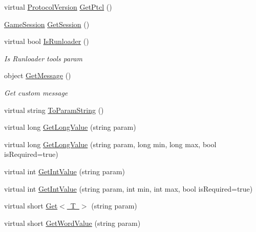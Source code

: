 \begin{DoxyCompactItemize}
virtual \mbox{\hyperlink{namespace_t_net_1_1_service_a6651119df6dac62b849ed58cf7ece2bd}{Protocol\+Version}} \mbox{\hyperlink{class_t_net_1_1_service_1_1_action_getter_aea751fe82e12246f5be7105d8c8c068c}{Get\+Ptcl}} ()
\item 
\mbox{\hyperlink{class_t_net_1_1_contract_1_1_game_session}{Game\+Session}} \mbox{\hyperlink{class_t_net_1_1_service_1_1_action_getter_aca0c42abc01b4f8b2e4e302dbb31098a}{Get\+Session}} ()
\item 
virtual bool \mbox{\hyperlink{class_t_net_1_1_service_1_1_action_getter_af318ee8a4671b6000b036c4c57221458}{Is\+Runloader}} ()
\begin{DoxyCompactList}\small\item\em Is Runloader tool\textquotesingle{}s param \end{DoxyCompactList}\item 
object \mbox{\hyperlink{class_t_net_1_1_service_1_1_action_getter_a4c526c4898248f3a804d8e49d9450c84}{Get\+Message}} ()
\begin{DoxyCompactList}\small\item\em Get custom message \end{DoxyCompactList}\item 
virtual string \mbox{\hyperlink{class_t_net_1_1_service_1_1_action_getter_a705ee3441e620f15dcb5e52fcd9727ec}{To\+Param\+String}} ()
\item 
virtual long \mbox{\hyperlink{class_t_net_1_1_service_1_1_action_getter_ada14b85166336d05bcb01e384edb2d7f}{Get\+Long\+Value}} (string param)
\item 
virtual long \mbox{\hyperlink{class_t_net_1_1_service_1_1_action_getter_acb9c5bcf560bbfa55f3db6bb6d47586e}{Get\+Long\+Value}} (string param, long min, long max, bool is\+Required=true)
\item 
virtual int \mbox{\hyperlink{class_t_net_1_1_service_1_1_action_getter_a257e2a314405806db29aa204371c3ced}{Get\+Int\+Value}} (string param)
\item 
virtual int \mbox{\hyperlink{class_t_net_1_1_service_1_1_action_getter_a4a772848d9d936d9dbcedbc6d7553462}{Get\+Int\+Value}} (string param, int min, int max, bool is\+Required=true)
\item 
virtual short \mbox{\hyperlink{class_t_net_1_1_service_1_1_action_getter_aaae6e4e9d0becae6b8b75757243e89df}{Get$<$ T $>$}} (string param)
\item 
virtual short \mbox{\hyperlink{class_t_net_1_1_service_1_1_action_getter_a8be520b300536485ba4108a52b2c9310}{Get\+Word\+Value}} (string param)
\item 

\end{DoxyCompactItemize}
